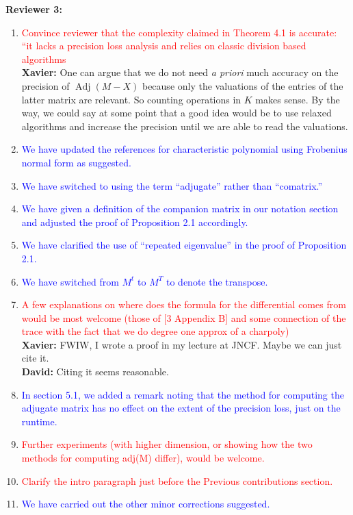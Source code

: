 \documentclass{sig-alternate-05-2015}
\DeclareMathOperator{\adj}{Adj}
\newcommand{\done}[1]{\textcolor{blue}{#1}}
\newcommand{\tdo}[1]{\textcolor{red}{#1}}
\newcommand{\xavier}[1]{\textcolor{answer}{{\bf Xavier:} #1}}
\newcommand{\david}[1]{\textcolor{answer}{{\bf David:} #1}}
\begin{document}
\textbf{Reviewer 3:}
\begin{enumerate}
\item \tdo{Convince reviewer that the complexity claimed in Theorem 4.1 is accurate: ``it lacks a precision loss analysis and relies on classic division based algorithms}\\
      \xavier{One can argue that we do not need \emph{a priori} much accuracy on the precision of $\adj(M-X)$ because only the valuations of the entries of the latter matrix are relevant. So counting operations in $K$ makes sense. By the way, we could say at some point that a good idea would be to use relaxed algorithms and increase the precision until we are able to read the valuations.}
\item \done{We have updated the references for characteristic polynomial using Frobenius normal form as suggested.}
\item \done{We have switched to using the term ``adjugate'' rather than ``comatrix.''}
\item \done{We have given a definition of the companion matrix in our notation section and adjusted the proof of Proposition 2.1 accordingly.}
\item \done{We have clarified the use of ``repeated eigenvalue'' in the proof of Proposition 2.1.}
\item \done{We have switched from $M^t$ to $M^T$ to denote the transpose.}
\item \tdo{A few explanations on where does the formula for the differential comes from
would be most welcome (those of [3 Appendix B] and some connection of the trace
with the fact that we do degree one approx of a charpoly)}\\
      \xavier{FWIW, I wrote a proof in my lecture at JNCF. Maybe we can just cite it.}\\
      \david{Citing it seems reasonable.}
\item \done{In section 5.1, we added a remark noting that the method for computing the adjugate matrix has no effect on the extent of the precision loss, just on the runtime.}
\item \tdo{Further experiments (with higher dimension, or showing how the two methods for computing adj(M) differ), would be welcome.}
\item \tdo{Clarify the intro paragraph just before the Previous contributions section.}
\item \done{We have carried out the other minor corrections suggested.}
\end{enumerate}
\end{document}
